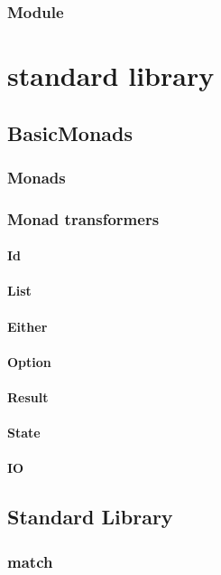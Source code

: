 \subsection{Module}


\chapter{standard library}
\section{BasicMonads}
\subsection{Monads}
\subsection{Monad transformers}
\subsubsection{Id}
\subsubsection{List}
\subsubsection{Either}
\subsubsection{Option}
\subsubsection{Result}
\subsubsection{State}
\subsubsection{IO}

\section{Standard Library}
\subsection{match}
